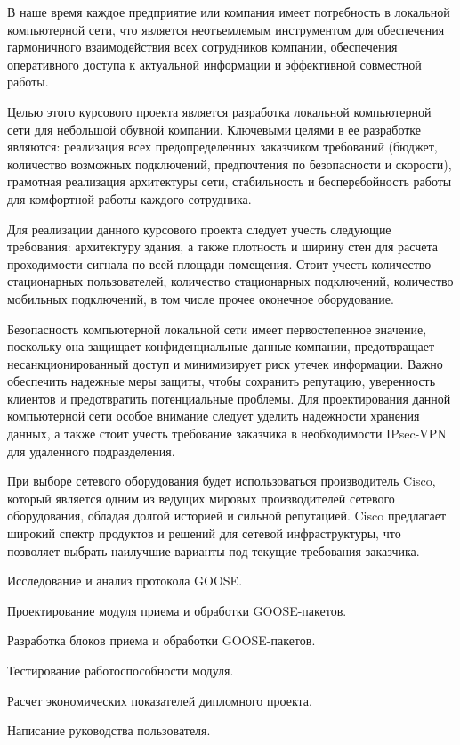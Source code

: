 \label{sec:intro}

В наше время каждое предприятие или компания имеет потребность в локальной компьютерной сети, что является неотъемлемым инструментом для обеспечения гармоничного взаимодействия всех сотрудников компании, обеспечения оперативного доступа к актуальной информации и эффективной совместной работы.

Целью этого курсового проекта является разработка локальной компьютерной сети для небольшой обувной компании. Ключевыми целями в ее разработке являются: реализация всех предопределенных заказчиком требований (бюджет, количество возможных подключений, предпочтения по безопасности и скорости), грамотная реализация архитектуры сети, стабильность и бесперебойность работы для комфортной работы каждого сотрудника.

Для реализации данного курсового проекта следует учесть следующие требования: архитектуру здания, а также плотность и ширину стен для расчета проходимости сигнала по всей площади помещения.
Стоит учесть количество стационарных пользователей, количество стационарных подключений, количество мобильных подключений, в том числе прочее оконечное оборудование.

Безопасность компьютерной локальной сети имеет первостепенное значение, поскольку она защищает конфиденциальные данные компании, предотвращает несанкционированный доступ и минимизирует риск утечек информации.
Важно обеспечить надежные меры защиты, чтобы сохранить репутацию, уверенность клиентов и предотвратить потенциальные проблемы.
Для проектирования данной компьютерной сети особое внимание следует уделить надежности хранения данных, а также стоит учесть требование заказчика в необходимости IPsec-VPN для удаленного подразделения.

При выборе сетевого оборудования будет использоваться производитель Cisco, который является одним из ведущих мировых производителей сетевого оборудования, обладая долгой историей и сильной репутацией.
Cisco предлагает широкий спектр продуктов и решений для сетевой инфраструктуры, что позволяет выбрать наилучшие варианты под текущие требования заказчика.

\begin{enumerate_num}
    \item Исследование и анализ протокола GOOSE.
    \item Проектирование модуля приема и обработки GOOSE-пакетов.
    \item Разработка блоков приема и обработки GOOSE-пакетов.
    \item Тестирование работоспособности модуля.
    \item Расчет экономических показателей дипломного проекта.
    \item Написание руководства пользователя.
\end{enumerate_num}
